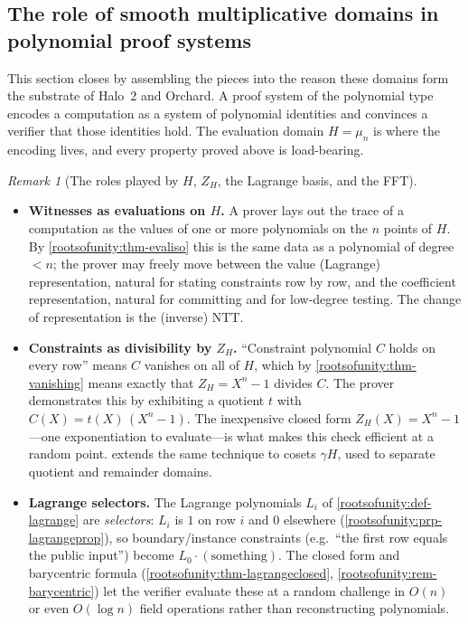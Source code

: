 \documentclass[11pt,a4paper]{article}
\theoremstyle{definition}
\theoremstyle{remark}
\newtheorem{remark}[theorem]{Remark}
\begin{document}
\subsection{The role of smooth multiplicative domains in polynomial proof systems}

This section closes by assembling the pieces into the reason these domains form the substrate of Halo~2 and Orchard. A proof system of the polynomial type encodes a computation as a system of polynomial identities and convinces a verifier that those identities hold. The evaluation domain \(H = \mu_n\) is where the encoding lives, and every property proved above is load-bearing.

\begin{remark}[The roles played by \(H\), \(Z_H\), the Lagrange basis, and the FFT]\label{rootsofunity:rem-whyproofsystems}
\leavevmode
\begin{itemize}
\item \textbf{Witnesses as evaluations on \(H\).} A prover lays out the trace of a computation as the values of one or more polynomials on the \(n\) points of \(H\). By \cref{rootsofunity:thm-evaliso} this is the same data as a polynomial of degree \(< n\); the prover may freely move between the value (Lagrange) representation, natural for stating constraints row by row, and the coefficient representation, natural for committing and for low-degree testing. The change of representation is the (inverse) NTT.

\item \textbf{Constraints as divisibility by \(Z_H\).} ``Constraint polynomial \(C\) holds on every row'' means \(C\) vanishes on all of \(H\), which by \cref{rootsofunity:thm-vanishing} means exactly that \(Z_H = X^n - 1\) divides \(C\). The prover demonstrates this by exhibiting a quotient \(t\) with \(C(X) = t(X)\,(X^n - 1)\). The inexpensive closed form \(Z_H(X) = X^n-1\)---one exponentiation to evaluate---is what makes this check efficient at a random point.  extends the same technique to cosets \(\gamma H\), used to separate quotient and remainder domains.

\item \textbf{Lagrange selectors.} The Lagrange polynomials \(L_i\) of \cref{rootsofunity:def-lagrange} are \emph{selectors}: \(L_i\) is \(1\) on row \(i\) and \(0\) elsewhere (\cref{rootsofunity:prp-lagrangeprop}), so boundary/instance constraints (e.g.\ ``the first row equals the public input'') become \(L_0 \cdot(\text{something})\). The closed form and barycentric formula (\cref{rootsofunity:thm-lagrangeclosed}, \cref{rootsofunity:rem-barycentric}) let the verifier evaluate these at a random challenge in \(O(n)\) or even \(O(\log n)\) field operations rather than reconstructing polynomials.


\end{itemize}
\end{remark}
\end{document}
